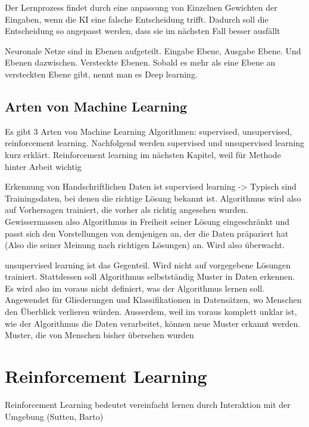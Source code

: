 Der Lernprozess findet durch eine anpassung von Einzelnen Gewichten der
Eingaben, wenn die KI eine falsche Entscheidung trifft. Dadurch soll die
Entscheidung so angepasst werden, dass sie im nächsten Fall besser ausfällt

Neuronale Netze sind in Ebenen aufgeteilt. Eingabe Ebene, Ausgabe Ebene. Und
Ebenen dazwischen. Versteckte Ebenen. Sobald es mehr als eine Ebene an
versteckten Ebene gibt, nennt man es Deep learning.

\subsection*{Arten von Machine Learning}

Es gibt 3 Arten von Machine Learning Algorithmen: supervised, unsupervised, reinforcement
learning. Nachfolgend werden supervised und unsupervised learning kurz erklärt.
Reinforcement learning im nächsten Kapitel, weil für Methode hinter Arbeit
wichtig

Erkennung von Handschriftlichen Daten ist supervised learning ->
Typisch sind Trainingsdaten, bei denen die richtige Lösung bekannt ist.
Algorithmus wird also auf Vorhersagen trainiert, die vorher als richtig
angesehen wurden. Gewissermassen also Algorithmus in Freiheit seiner Lösung
eingeschränkt und passt sich den Vorstellungen von demjenigen an, der die Daten präpariert hat (Also die seiner Meinung nach richtigen Lösungen) an. Wird also überwacht.

unsupervised learning ist das Gegenteil. Wird nicht auf vorgegebene Lösungen
trainiert. Stattdessen soll Algorithmus selbstständig Muster in Daten erkennen.
Es wird also im voraus nicht definiert, was der Algorithmus lernen soll.
Angewendet für Gliederungen und Klassifikationen in Datensätzen, wo Menschen den
Überblick verlieren würden. Ausserdem, weil im voraus komplett unklar ist, wie
der Algorithmus die Daten verarbeitet, können neue Muster erkannt werden.
Muster, die von Menschen bisher übersehen wurden 







\section{Reinforcement Learning}
\label{chap:t_rl}

Reinforcement Learning bedeutet vereinfacht lernen durch Interaktion mit der
Umgebung (Sutten, Barto) 


